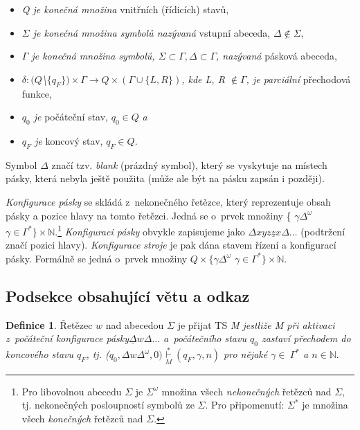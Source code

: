 \documentclass[11pt, a4paper]{article}
\theoremstyle{definition}
\newtheorem{definice}{Definice}
\begin{document}
\begin{twocolumn}
\begin{itemize}
    \item \textit{Q je konečná množina} vnitřních (řídicích) stavů,
    \item \textit{$\Sigma$ je konečná množina symbolů nazývaná} vstupní abeceda, $\Delta \notin \Sigma$,
    \item \textit{$\Gamma$ je konečná množina symbolů, $\Sigma \subset \Gamma, \Delta \subset \Gamma$, nazývaná} pásková abeceda,
    \item \textit{$\delta:(Q$\textbackslash$\{q_F\})\!\times\!\Gamma\!\rightarrow Q\!\times\!(\Gamma\!\cup\!\{\!L,R\}\!)$, kde L, R $\notin\Gamma$, je parciální} přechodová funkce,
    \item \textit{$q_0$ je} počáteční stav, $q_0 \in Q$ \textit{a}
    \item \textit{$q_F$ je} koncový stav, $q_F \in Q$.
\end{itemize}

Symbol $\Delta$ značí tzv. \textit{blank} (prázdný symbol), který se vyskytuje na místech pásky, která nebyla ještě použita (může ale být na pásku zapsán i později).

\textit{Konfigurace pásky} se skládá z~nekonečného řetězce, který reprezentuje obsah pásky a pozice hlavy na tomto řetězci. Jedná se o~prvek množiny \{ $ \gamma \Delta^\omega$ \textbar $\gamma \in \Gamma^* \} \times \mathbb{N} $.\footnote{Pro libovolnou abecedu $\Sigma$ je $\Sigma^\omega$ množina všech \textit{nekonečných} řetězců nad $\Sigma$, tj. nekonečných posloupností symbolů ze $\Sigma$. Pro připomenutí: $\Sigma^*$ je množina všech \textit{konečných} řetězců nad $\Sigma$.} \textit{Konfiguraci pásky} obvykle zapisujeme jako $\Delta xyz \underline{z}x \Delta \dots$ (podtržení značí pozici hlavy). \textit{Konfigurace stroje} je pak dána stavem řízení a konfigurací pásky. Formálně se jedná o~prvek množiny $Q \times \{ \gamma \Delta^\omega$ \textbar $ \gamma \in \Gamma^*\} \times \mathbb{N}.$

\subsection{Podsekce obsahující větu a odkaz}
\begin{definice} \label{Def2}
Řetězec $w$ nad abecedou $\Sigma$ je přijat TS \textit{M jestliže M při aktivaci z~počáteční konfigurace pásky\linebreak $\underline{\Delta}w\Delta\dots$ a~počátečního stavu $q_0$ zastaví přechodem do koncového stavu $q_F$, tj. ($q_0, \Delta w\Delta^\omega, 0) \underset{M}{\overset{*}{\vdash}} (q_F, \gamma, n)$ pro nějaké $\gamma \in~\Gamma^*$ a $n \in \mathbb{N}$}.


\end{definice}
\end{twocolumn}
\end{document}

